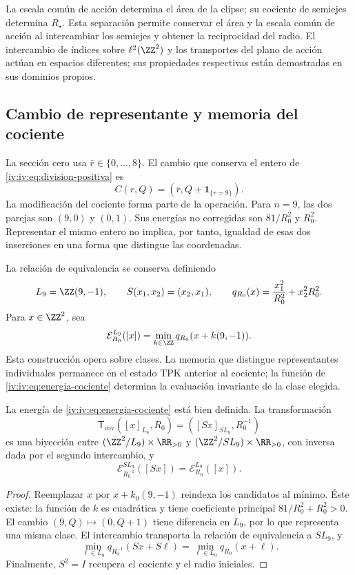 La escala común de acción determina el área de la elipse; su cociente
de semiejes determina \(R_\star\). Esta separación permite conservar
el área y la escala común de acción al intercambiar los semiejes y obtener la reciprocidad
del radio. El intercambio de índices sobre \(\ell^2(\ZZ^2)\)
y los transportes del plano de acción actúan en espacios diferentes;
sus propiedades respectivas están demostradas en sus dominios propios.

\subsection{Cambio de representante y memoria del cociente}

La sección cero usa \(\bar r\in\{0,\ldots,8\}\). El cambio
que conserva el entero de \eqref{iv:iv:eq:division-positiva} es
\begin{equation}
 C(r,Q)=(\bar r,Q+\mathbf1_{\{r=9\}}).
 \label{iv:iv:eq:cambio-seccion}
\end{equation}
La modificación del cociente forma parte de la operación.
Para \(n=9\), las dos parejas son \((9,0)\) y \((0,1)\).
Sus energías no corregidas son \(81/R_0^2\) y \(R_0^2\).
Representar el mismo entero no implica, por tanto, igualdad de
esas dos inserciones en una forma que distingue las coordenadas.

La relación de equivalencia se conserva definiendo
\[
 L_9=\ZZ(9,-1),\qquad S(x_1,x_2)=(x_2,x_1),
 \qquad q_{R_0}(x)=\frac{x_1^2}{R_0^2}+x_2^2R_0^2.
\]
Para \(x\in\ZZ^2\), sea
\begin{equation}
 \mathcal E_{R_0}^{L_9}([x])
 =\min_{k\in\ZZ}q_{R_0}(x+k(9,-1)).
 \label{iv:iv:eq:energia-cociente}
\end{equation}
Esta construcción opera sobre clases. La memoria que distingue
representantes individuales permanece en el estado TPK anterior
al cociente; la función de \eqref{iv:iv:eq:energia-cociente}
determina la evaluación invariante de la clase elegida.

\begin{theorem}
\label{iv:iv:thm:dualidad-cociente}
La energía de \eqref{iv:iv:eq:energia-cociente} está bien definida.
La transformación
\[
 \mathsf T_{\mathrm{cov}}([x]_{L_9},R_0)
 =([Sx]_{SL_9},R_0^{-1})
\]
es una biyección entre
\((\ZZ^2/L_9)\times\RR_{>0}\) y
\((\ZZ^2/SL_9)\times\RR_{>0}\), con inversa dada por el
segundo intercambio, y
\[
 \mathcal E_{R_0^{-1}}^{SL_9}([Sx])
 =\mathcal E_{R_0}^{L_9}([x]).
\]
\end{theorem}
\begin{proof}
Reemplazar \(x\) por \(x+k_0(9,-1)\) reindexa los candidatos
al mínimo. Éste existe: la función de \(k\) es cuadrática y
tiene coeficiente principal \(81/R_0^2+R_0^2>0\). El cambio
\((9,Q)\mapsto(0,Q+1)\) tiene diferencia en \(L_9\), por
lo que representa una misma clase. El intercambio transporta
la relación de equivalencia a \(SL_9\), y
\[
 \min_{\ell\in L_9}q_{R_0^{-1}}(Sx+S\ell)
 =\min_{\ell\in L_9}q_{R_0}(x+\ell).
\]
Finalmente, \(S^2=I\) recupera el cociente y el radio iniciales.
\end{proof}

